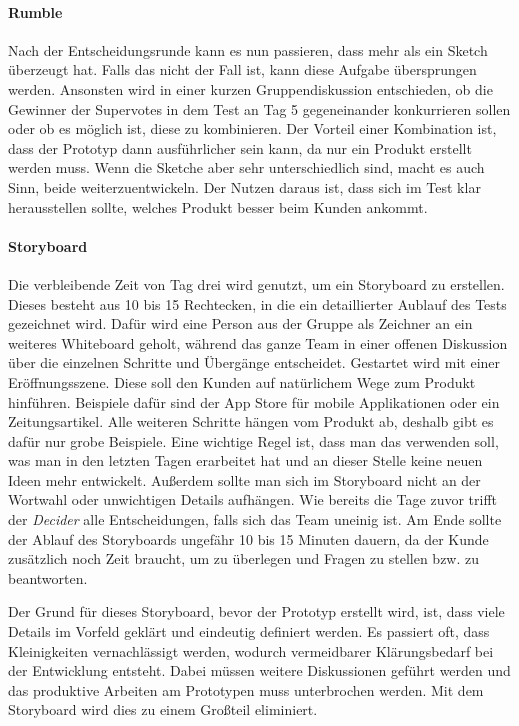 \paragraph{Rumble}
\label{sec:Sprint-Tag3-Rumble}
Nach der Entscheidungsrunde kann es nun passieren, dass mehr als ein Sketch überzeugt hat. Falls das nicht der Fall ist, kann diese Aufgabe übersprungen werden. Ansonsten wird in einer kurzen Gruppendiskussion entschieden, ob die Gewinner der Supervotes in dem Test an Tag 5 gegeneinander konkurrieren sollen oder ob es möglich ist, diese zu kombinieren. Der Vorteil einer Kombination ist, dass der Prototyp dann ausführlicher sein kann, da nur ein Produkt erstellt werden muss. Wenn die Sketche aber sehr unterschiedlich sind, macht es auch Sinn, beide weiterzuentwickeln. Der Nutzen daraus ist, dass sich im Test klar herausstellen sollte, welches Produkt besser beim Kunden ankommt. 

\paragraph{Storyboard}
\label{sec:Sprint-Tag3-Storyboard}
Die verbleibende Zeit von Tag drei wird genutzt, um ein Storyboard zu erstellen. Dieses besteht aus 10 bis 15 Rechtecken, in die ein detaillierter Aublauf des Tests gezeichnet wird. Dafür wird eine Person aus der Gruppe als Zeichner an ein weiteres Whiteboard geholt, während das ganze Team in einer offenen Diskussion über die einzelnen Schritte und Übergänge entscheidet. Gestartet wird mit einer Eröffnungsszene. Diese soll den Kunden auf natürlichem Wege zum Produkt hinführen. Beispiele dafür sind der App Store für mobile Applikationen oder ein Zeitungsartikel. Alle weiteren Schritte hängen vom Produkt ab, deshalb gibt es dafür nur grobe Beispiele. Eine wichtige Regel ist, dass man das verwenden soll, was man in den letzten Tagen erarbeitet hat und an dieser Stelle keine neuen Ideen mehr entwickelt. Außerdem sollte man sich im Storyboard nicht an der Wortwahl oder unwichtigen Details aufhängen. Wie bereits die Tage zuvor trifft der \textit{Decider} alle Entscheidungen, falls sich das Team uneinig ist. Am Ende sollte der Ablauf des Storyboards ungefähr 10 bis 15 Minuten dauern, da der Kunde zusätzlich noch Zeit braucht, um zu überlegen und Fragen zu stellen bzw. zu beantworten.

Der Grund für dieses Storyboard, bevor der Prototyp erstellt wird, ist, dass viele Details im Vorfeld geklärt und eindeutig definiert werden. Es passiert oft, dass Kleinigkeiten vernachlässigt werden, wodurch vermeidbarer Klärungsbedarf bei der Entwicklung entsteht. Dabei müssen weitere Diskussionen geführt werden und das produktive Arbeiten am Prototypen muss unterbrochen werden. Mit dem Storyboard wird dies zu einem Großteil eliminiert.

